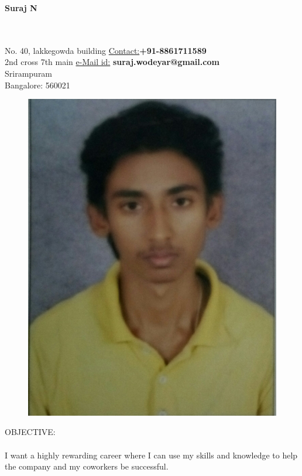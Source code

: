 \documentclass[14pt,a4paper]{article}
\begin{document}
\begin{center}
\textbf{\LARGE Suraj N }\\
\noindent\makebox[\linewidth]{\rule{\paperwidth}{0.4pt}}\\
\end{center}

\hfill\\
No. 40, lakkegowda building  \hfill     \underline{Contact:}\textbf{+91-8861711589}\\
2nd cross 7th main \hfill  \underline{e-Mail id:}\textbf{ suraj.wodeyar@gmail.com}\\
 Srirampuram\\
Bangalore: 560021\\

\begin{figure}[h]

\hfill \includegraphics[scale=0.05]{pic.jpg}
\end{figure}

\begin{paragraph}{\large OBJECTIVE:\\}
\hfil\\
I want a highly rewarding career where I can use my skills and knowledge to help the company and my coworkers be successful.\\
\end{paragraph}
\end{document}
